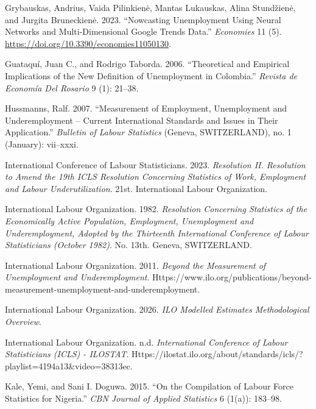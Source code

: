 \documentclass[
  letterpaper,
  DIV=11,
  numbers=noendperiod]{scrartcl}
\newlength{\cslhangindent}
\newenvironment{CSLReferences}[2] %
 {\begin{list}{}{%
  \setlength{\itemindent}{0pt}
  \setlength{\leftmargin}{0pt}
  \setlength{\parsep}{0pt}
  \ifodd #1
   \setlength{\leftmargin}{\cslhangindent}
   \setlength{\itemindent}{-1\cslhangindent}
  \fi
  \setlength{\itemsep}{#2\baselineskip}}}
 {\end{list}}
\begin{document}
\begin{CSLReferences}{1}{1}
Grybauskas, Andrius, Vaida Pilinkienė, Mantas Lukauskas, Alina
Stundžienė, and Jurgita Bruneckienė. 2023. {``Nowcasting {Unemployment
Using Neural Networks} and {Multi-Dimensional Google Trends Data}.''}
\emph{Economies} 11 (5).
\url{https://doi.org/10.3390/economies11050130}.

Guataquí, Juan C., and Rodrigo Taborda. 2006. {``Theoretical and
Empirical Implications of the New Definition of Unemployment in
{Colombia}.''} \emph{Revista de Economía Del Rosario} 9 (1): 21--38.

Hussmanns, Ralf. 2007. {``Measurement of Employment, Unemployment and
Underemployment -- {Current} International Standards and Issues in Their
Application.''} \emph{Bulletin of Labour Statistics} (Geneva,
SWITZERLAND), no. 1 (January): vii--xxxi.

International Conference of Labour Statisticians. 2023. \emph{Resolution
{II}. {Resolution} to Amend the 19th {ICLS} Resolution Concerning
Statistics of Work, Employment and Labour Underutilization}. 21st.
International Labour Organization.

International Labour Organization. 1982. \emph{Resolution Concerning
Statistics of the Economically Active Population, Employment,
Unemployment and Underemployment, Adopted by the {Thirteenth
International Conference} of {Labour Statisticians} ({October} 1982)}.
No. 13th. Geneva, SWITZERLAND.

International Labour Organization. 2011. \emph{Beyond the Measurement of
Unemployment and Underemployment}.
Https://www.ilo.org/publications/beyond-measurement-unemployment-and-underemployment.

International Labour Organization. 2026. \emph{{ILO} Modelled Estimates
{Methodological} Overview}.

International Labour Organization. n.d. \emph{International {Conference}
of {Labour Statisticians} ({ICLS}) - {ILOSTAT}}.
Https://ilostat.ilo.org/about/standards/icls/?playlist=4194a13\&video=38313ec.

Kale, Yemi, and Sani I. Doguwa. 2015. {``On the {Compilation} of {Labour
Force Statistics} for {Nigeria}.''} \emph{CBN Journal of Applied
Statistics} 6 (1(a)): 183--98.


\end{CSLReferences}
\end{document}
